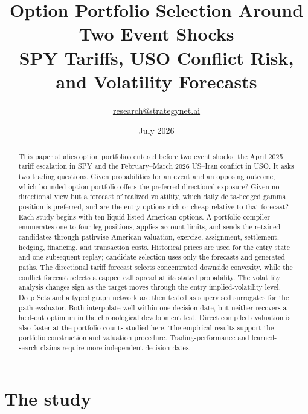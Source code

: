 \documentclass{strategynet-journal}
\title{Option Portfolio Selection Around Two Event Shocks\\
\large SPY Tariffs, USO Conflict Risk, and Volatility Forecasts}
\author{\href{mailto:research@strategynet.ai}{research@strategynet.ai}}
\date{July 2026}
\begin{document}
\maketitle

\begin{abstract}
This paper studies option portfolios entered before two event shocks: the April 2025 tariff escalation in SPY and the February--March 2026 US--Iran conflict in USO.  It asks two trading questions.  Given probabilities for an event and an opposing outcome, which bounded option portfolio offers the preferred directional exposure?  Given no directional view but a forecast of realized volatility, which daily delta-hedged gamma position is preferred, and are the entry options rich or cheap relative to that forecast?  Each study begins with ten liquid listed American options.  A portfolio compiler enumerates one-to-four-leg positions, applies account limits, and sends the retained candidates through pathwise American valuation, exercise, assignment, settlement, hedging, financing, and transaction costs.  Historical prices are used for the entry state and one subsequent replay; candidate selection uses only the forecasts and generated paths.  The directional tariff forecast selects concentrated downside convexity, while the conflict forecast selects a capped call spread at its stated probability.  The volatility analysis changes sign as the target moves through the entry implied-volatility level.  Deep Sets and a typed graph network are then tested as supervised surrogates for the path evaluator.  Both interpolate well within one decision date, but neither recovers a held-out optimum in the chronological development test.  Direct compiled evaluation is also faster at the portfolio counts studied here.  The empirical results support the portfolio construction and valuation procedure.  Trading-performance and learned-search claims require more independent decision dates.
\end{abstract}

\SNtwocolumntableofcontents

\section{The study}
\end{document}

